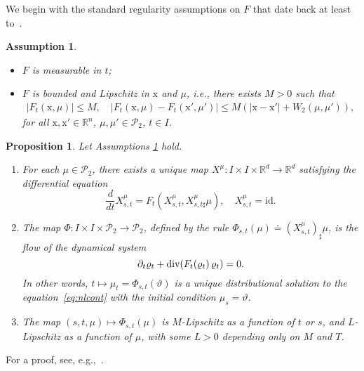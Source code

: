 \documentclass[sn-mathphys-num]{sn-jnl}
\numberwithin{equation}{section}
\theoremstyle{mythm}
\newtheorem{proposition}{Proposition}[section]
\theoremstyle{mydef}
\newtheorem{assumption}{Assumption}\renewcommand{\theassumption}{(A\arabic{assumption})}  %
\renewcommand{\div}{\mathop{\rm div}}
\newcommand{\id}{\mathrm{id}}
\begin{document}
We begin with the standard regularity assumptions on \( F \) that date back at least to~\cite{piccoliTransportEquationNonlocal2013}.

\begin{tcolorbox}
\begin{assumption}
    \label{F1}
    ~
\begin{itemize}
	\item \( F \) is measurable in \( t \);
	\item \( F \) is bounded and Lipschitz in \( \mathrm{x} \) and \( \mu \), i.e., there exists \( M > 0 \) such that
	    \begin{gather*}
        \left|F_t(\mathrm{x},\mu)\right|\le M,\quad
	\left|F_{t}(\mathrm{x},\mu)-F_{t}(\mathrm{x}',\mu')\right|\le M\left(|\mathrm{x}-\mathrm{x}'|+W_{2}(\mu,\mu')\right),
	  \end{gather*}
		for all \( \mathrm{x},\mathrm{x}'\in \mathbb{R}^n \), \( \mu,\mu'\in \mathcal{P}_2 \), \( t\in I \).
\end{itemize}
\end{assumption}
\end{tcolorbox}
\begin{proposition}
  \label{prop:basic}
  Let Assumptions \ref{F1} hold.
\begin{enumerate}[\rm (1)]
  \item For each \( \mu\in \mathcal{P}_{2} \), there exists a unique map \(X^{\mu}\colon  I \times I\times \mathbb{R}^d \to \mathbb{R}^d \) satisfying the differential equation
\[
  \frac{d}{dt} X^{\mu}_{s,t} = F_t\left(X^{\mu}_{s,t},X^{\mu}_{s,t\sharp}\mu\right),\quad X^{\mu}_{s,t}=\id.
				\]
  \item The map \( \Phi\colon  I \times  I \times \mathcal{P}_2\to \mathcal{P}_2 \), defined by the rule \( \Phi_{s,t}(\mu) \doteq (X^{\mu}_{s,t})_\sharp \mu \), is the flow of the dynamical system 
        \begin{equation}
          \partial_t \varrho_t + \div(F_t(\varrho_t)\,\varrho_t) = 0.
          \label{eq:nlcont}
        \end{equation}
In other words, \(t \mapsto \mu_t = \Phi_{s,t}(\vartheta) \) is a unique distributional solution to the equation~\eqref{eq:nlcont} with the initial condition \( \mu_{s} = \vartheta \).

\item The map \( (s,t,\mu)\mapsto \Phi_{s,t}(\mu) \) is \( M \)-Lipschitz as a function of \( t \) or \( s \), and \( L \)-Lipschitz as a function of \( \mu \), with some \( L>0 \) depending only on \( M \) and \( T \).
\end{enumerate}
\end{proposition}
For a proof, see, e.g.,~\cite{piccoliTransportEquationNonlocal2013}.
\end{document}
